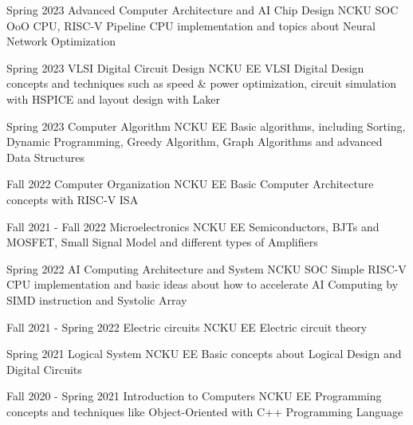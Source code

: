 

\begin{cventries}
  \cventry
  {Spring 2023}
  {Advanced Computer Architecture and AI Chip Design}
  {NCKU SOC}
  {}
  {OoO CPU, RISC-V Pipeline CPU implementation and topics about Neural Network Optimization}

  \cventry
  {Spring 2023}
  {VLSI Digital Circuit Design}
  {NCKU EE}
  {}
  {VLSI Digital Design concepts and techniques such as speed \& power optimization, circuit simulation with HSPICE and layout design with Laker}

  \cventry
  {Spring 2023}
  {Computer Algorithm}
  {NCKU EE}
  {}
  {Basic algorithms, including Sorting, Dynamic Programming, Greedy Algorithm, Graph Algorithms and advanced Data Structures}

  \cventry
  {Fall 2022} %
  {Computer Organization} %
  {NCKU EE}
  {} %
  {Basic Computer Architecture concepts with RISC-V ISA} %

  \cventry
  {Fall 2021 - Fall 2022}
  {Microelectronics}
  {NCKU EE}
  {}
  {Semiconductors, BJTs and MOSFET, Small Signal Model and different types of Amplifiers}

  \cventry
  {Spring 2022}
  {AI Computing Architecture and System}
  {NCKU SOC}
  {}
  {Simple RISC-V CPU implementation and basic ideas about how to accelerate AI Computing by SIMD instruction and Systolic Array}

  \cventry
  {Fall 2021 - Spring 2022}
  {Electric circuits}
  {NCKU EE}
  {}
  {Electric circuit theory}

  \cventry
  {Spring 2021}
  {Logical System}
  {NCKU EE}
  {}
  {Basic concepts about Logical Design and Digital Circuits}

  \cventry
  {Fall 2020 - Spring 2021}
  {Introduction to Computers}
  {NCKU EE}
  {}
  {Programming concepts and techniques like Object-Oriented with C++ Programming Language}
\end{cventries}

